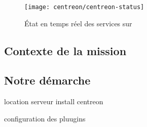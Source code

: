 \begin{figure}
	\centering
	\texttt{[image: centreon/centreon-status]}
	\caption{État en temps réel des services sur \acentreon{}}
	\label{figure:centreon:centreon}
\end{figure}


\subsection{Contexte de la mission}


\subsection{Notre démarche}

location serveur
install centreon

configuration des pluugins




